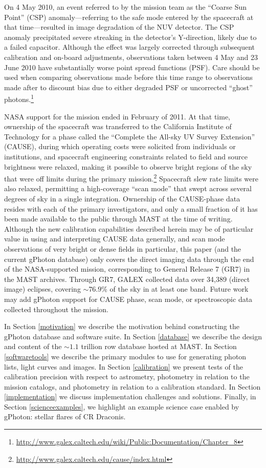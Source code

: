 \documentclass[preprint]{aastex}
\begin{document}
On 4 May 2010, an event referred to by the mission team as the ``Coarse Sun Point'' (CSP) anomaly---referring to the safe mode entered by the spacecraft at that time---resulted in image degradation of the NUV detector. The CSP anomaly precipitated severe streaking in the detector's Y-direction, likely due to a failed capacitor. Although the effect was largely corrected through subsequent calibration and on-board adjustments, observations taken between 4 May and 23 June 2010 have substantially worse point spread functions (PSF). Care should be used when comparing observations made before this time range to observations made after to discount bias due to either degraded PSF or uncorrected ``ghost'' photons.\footnote{\url{http://www.galex.caltech.edu/wiki/Public:Documentation/Chapter_8}}

NASA support for the mission ended in February of 2011. At that time, ownership of the spacecraft was transferred to the California Institute of Technology for a phase called the ``Complete the All-sky UV Survey Extension'' (CAUSE), during which operating costs were solicited from individuals or institutions, and spacecraft engineering constraints related to field and source brightness were relaxed, making it possible to observe bright regions of the sky that were off limits during the primary mission.\footnote{\url{http://www.galex.caltech.edu/cause/index.html}} Spacecraft slew rate limits were also relaxed, permitting a high-coverage ``scan mode'' that swept across several degrees of sky in a single integration. Ownership of the CAUSE-phase data resides with each of the primary investigators, and only a small fraction of it has been made available to the public through MAST at the time of writing. Although the new calibration capabilities described herein may be of particular value in using and interpreting CAUSE data generally, and scan mode observations of very bright or dense fields in particular, this paper (and the current gPhoton database) only covers the direct imaging data through the end of the NASA-supported mission, corresponding to General Release 7 (GR7) in the MAST archives. Through GR7, GALEX collected data over 34,389 (direct image) eclipses, covering $\sim76.9\%$ of the sky in at least one band. Future work may add gPhoton support for CAUSE phase, scan mode, or spectroscopic data collected throughout the mission.

In Section \ref{motivation} we describe the motivation behind constructing the gPhoton database and software suite. In Section \ref{database} we describe the design and content of the $\sim 1.1$ trillion row database hosted at MAST. In Section \ref{softwaretools} we describe the primary modules to use for generating photon lists, light curves and images. In Section \ref{calibration} we present tests of the calibration precision with respect to astrometry, photometry in relation to the mission catalogs, and photometry in relation to a calibration standard. In Section \ref{implementation} we discuss implementation challenges and solutions. Finally, in Section \ref{scienceexamples}, we highlight an example science case enabled by gPhoton: stellar flares of CR Draconis.
\end{document}
